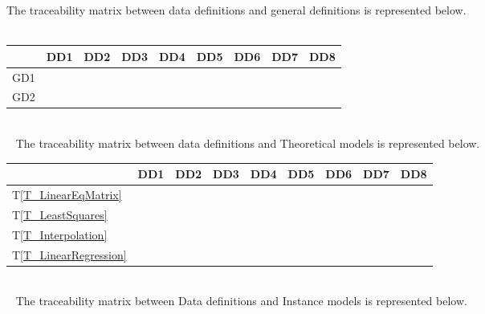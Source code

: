 \documentclass[12pt]{article}
\newcommand{\tref}[1]{T\ref{#1}}
\begin{document}
The traceability matrix between data definitions and general definitions is represented below.\\
~\newline
\begin{tabular}{|p{1.3cm}|p{1cm}|p{1cm}|p{1cm}|p{1cm}|p{1cm}|p{1cm}|p{1cm}|p{1cm}|}
	
	\hline
	 & DD1 & DD2 & DD3 & DD4 & DD5 & DD6 & DD7 & DD8\\
	 \hline
	 GD1 & \checkmark & \checkmark  & \checkmark  & \checkmark  & \checkmark  & \checkmark   & \checkmark & \checkmark\\
	  \hline
	 GD2 &  &   &   &   &   & \checkmark   & \checkmark & \checkmark \\
	 
	\hline
	
\end{tabular}\\
~\newline
The traceability matrix between data definitions and Theoretical models is represented below.\\

\begin{tabular}{|p{1.3cm}|p{1cm}|p{1cm}|p{1cm}|p{1cm}|p{1cm}|p{1cm}|p{1cm}|p{1cm}|}
	
	\hline
	& DD1 & DD2 & DD3 & DD4 & DD5 & DD6 & DD7 & DD8\\
	\hline
	\tref{T_LinearEqMatrix} & \checkmark & \checkmark  & \checkmark  & \checkmark  &   & \checkmark   & \checkmark & \checkmark\\
	\hline
	\tref{T_LeastSquares} &  &   &   &   &   & \checkmark   & \checkmark & \checkmark \\
	\hline
	\tref{T_Interpolation} & \checkmark & \checkmark  & \checkmark  & \checkmark  & \checkmark  &    &  &  \\
	\hline
	\tref{T_LinearRegression} &  &   &   &   &   & \checkmark   & \checkmark & \checkmark \\
	\hline
\end{tabular}\\


~\newline
The traceability matrix between Data definitions and Instance models is represented below.\\
\end{document}
